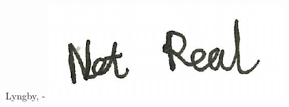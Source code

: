 \vspace{20mm}
\begin{center}
    \hspace{20mm} Lyngby, \thesishandin-\thesisyear
    \vspace{5mm}
    \newline
    \includegraphics[scale=0.5]{figures/signaturedummy}
\end{center}
\begin{flushright}
    \thesisauthor
\end{flushright}
